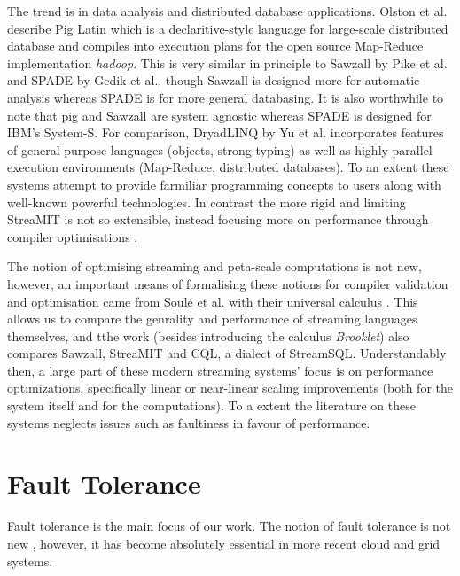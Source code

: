 The trend is in data analysis and distributed database applications.
Olston et al. describe Pig Latin \cite{ols08} which is a declaritive-style language for large-scale distributed database and compiles into execution plans for the open source Map-Reduce implementation {\em hadoop}.
This is very similar in principle to Sawzall \cite{pik05} by Pike et al. and SPADE \cite{ged08} by Gedik et al., though Sawzall is designed more for automatic analysis whereas SPADE is for more general databasing.
It is also worthwhile to note that pig and Sawzall are system agnostic whereas SPADE is designed for IBM's System-S.
For comparison, DryadLINQ \cite{yu08} by Yu et al. incorporates features of general purpose languages (objects, strong typing) as well as highly parallel execution environments (Map-Reduce, distributed databases).
To an extent these systems attempt to provide farmiliar programming concepts to users along with well-known powerful technologies.
In contrast the more rigid and limiting StreaMIT is not so extensible, instead focusing more on performance through compiler optimisations \cite{thies01}.

The notion of optimising streaming and peta-scale computations is not new, however, an important means of formalising these notions for compiler validation and optimisation came from Soul{\'e} et al. with their universal calculus \cite{sou10}.
This allows us to compare the genrality and performance of streaming languages themselves, and tthe work (besides introducing the calculus {\em Brooklet}) also compares Sawzall, StreaMIT and CQL, a dialect of StreamSQL.
Understandably then, a large part of these modern streaming systems' focus is on performance optimizations, specifically linear or near-linear scaling improvements (both for the system itself and for the computations).
To a extent the literature on these systems neglects issues such as faultiness in favour of performance.

\section{Fault Tolerance}

Fault tolerance is the main focus of our work.
The notion of fault tolerance is not new \cite{ran75}, however, it has become absolutely essential in more recent cloud and grid systems.

